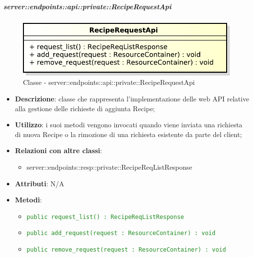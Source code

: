 
    \subparagraph{server::endpoints::api::private::RecipeRequestApi} %
    \label{subp:bdsm_app_server_endpoints_api_private::reciperequestapi}
	\begin{figure}[!htbp]
		\centering
		\centerline{\includegraphics[scale=0.6]{./images/server/classes/endpoints/recipe_request_api.pdf}}
		\caption{Classe - server::endpoints::api::private::RecipeRequestApi}
	\end{figure}
    \begin{itemize}
      \item \textbf{Descrizione}: classe che rappresenta l'implementazione delle web API relative alla gestione delle richieste di aggiunta Recipe;
      \item \textbf{Utilizzo}: i suoi metodi vengono invocati quando viene inviata una richiesta di nuova Recipe o la rimozione di una richiesta esistente da parte del client;
      \item \textbf{Relazioni con altre classi}:
        \begin{itemize}
          \item server::endpoints::resp::private::RecipeReqListResponse
        \end{itemize}
		\item \textbf{Attributi}: N/A
		\item \textbf{Metodi}:
			\begin{itemize}
				\item \textcolor{forestgreen}{\texttt{public request\_list() : RecipeReqListResponse}}
				\item \textcolor{forestgreen}{\texttt{public add\_request(request : ResourceContainer) : void}}
				\item \textcolor{forestgreen}{\texttt{public remove\_request(request : ResourceContainer) : void}}
     	 \end{itemize}
      \end{itemize}
